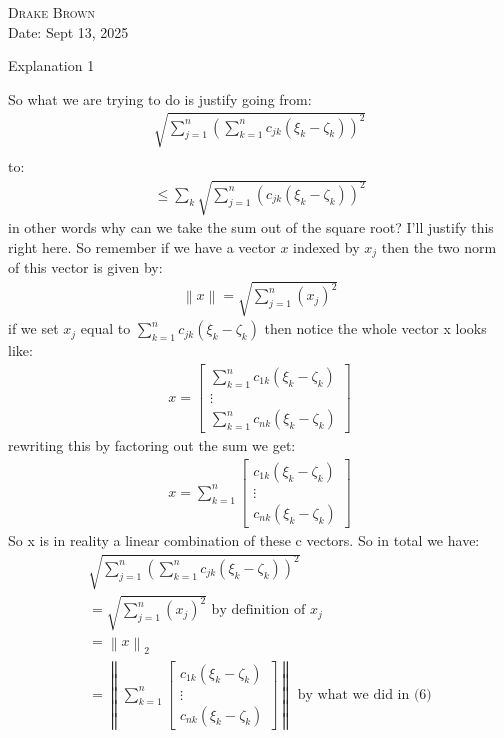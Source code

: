 \documentclass[12pt]{article}
\newcommand{\norm}[1]{\left\lVert#1\right\rVert}
\theoremstyle{definition}
\theoremstyle{remark}
\begin{document}
\begin{flushright}
	\textsc{Drake Brown}  \\
	Date: Sept 13, 2025
\end{flushright}
\begin{center}
	Explanation 1
\end{center}

So what we are trying to do is justify going from:
\begin{align}
	\sqrt{\sum\limits_{j=1}^{n}(\sum_{k=1}^nc_{jk}(\xi_k-\zeta_k))^2} \\
\end{align}
to:
\begin{align}
	\leq \sum_k\sqrt{\sum\limits_{j=1}^{n}(c_{jk}(\xi_k-\zeta_k))^2}
\end{align}
in other words why can we take the sum out of the square root? I'll justify this right here. So remember if we have a vector $x$ indexed by $x_j$ then the two norm of this vector is given by:
\begin{align}
	\norm{x}=\sqrt{\sum_{j=1}^n(x_j)^2}
\end{align}
if we set $x_j$ equal to $\sum_{k=1}^n c_{jk}(\xi_k-\zeta_k)$ then notice the whole vector x looks like:
\begin{align}
	x= %
	\begin{bmatrix}
		\sum_{k=1}^nc_{1k}(\xi_k-\zeta_k) \\
		\vdots                            \\
		\sum_{k=1}^nc_{nk}(\xi_k-\zeta_k)
	\end{bmatrix}
\end{align}
rewriting this by factoring out the sum we get:
\begin{align}
	x=\sum_{k=1}^n\begin{bmatrix}
		              c_{1k}(\xi_k-\zeta_k) \\
		              \vdots                \\
		              c_{nk}(\xi_k-\zeta_k)
	              \end{bmatrix}
\end{align}
So x is in reality a linear combination of these c vectors. So in total we have:
\begin{align}
	\sqrt{\sum\limits_{j=1}^{n}(\sum_{k=1}^nc_{jk}(\xi_k-\zeta_k))^2} \\
	=\sqrt{\sum_{j=1}^n(x_j)^2} \text{ by definition of } x_j         \\
	=\norm{x}_2                                                       \\
	=\norm{\sum_{k=1}^n\begin{bmatrix}
			                   c_{1k}(\xi_k-\zeta_k) \\
			                   \vdots                \\
			                   c_{nk}(\xi_k-\zeta_k)
		                   \end{bmatrix}
	} \text{ by what we did in (6)}
\end{align}
\end{document}
